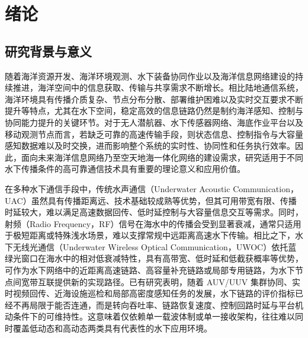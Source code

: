 \chapter{绪论}
\label{chap:intro}

\section{研究背景与意义} 
\label{sec:background}

随着海洋资源开发、海洋环境观测、水下装备协同作业以及海洋信息网络建设的持续推进，海洋空间中的信息获取、传输与共享需求不断增长。相比陆地通信系统，海洋环境具有传播介质复杂、节点分布分散、部署维护困难以及实时交互要求不断提升等特点，尤其在水下空间，稳定高效的信息链路仍然是制约海洋感知、控制与协同能力提升的关键环节。对于无人潜航器、水下传感器网络、海底作业平台以及移动观测节点而言，若缺乏可靠的高速传输手段，则状态信息、控制指令与大容量感知数据难以及时交换，进而影响整个系统的实时性、协同性和任务执行效率。因此，面向未来海洋信息网络乃至空天地海一体化网络的建设需求，研究适用于不同水下传播条件的高可靠通信技术具有重要的理论意义和应用价值\cite{zhangShuiXiaWuRenQianHangQiJiQunFaZhanXianZhuangJiGuanJianJiShuZongShu2020, hoeherUnderwaterOpticalWireless2021}。

在多种水下通信手段中，传统水声通信（Underwater Acoustic Communication，UAC）虽然具有传播距离远、技术基础较成熟等优势，但其可用带宽有限、传播时延较大，难以满足高速数据回传、低时延控制与大容量信息交互等需求\cite{liRecentProgressUnderwater2025, jungControlRealTimeMonitoring2025}。同时，射频（Radio Frequency，RF）信号在海水中的传播会受到显著衰减，通常只适用于极短距离或特殊浅水场景，难以支撑常规中远距离高速水下传输\cite{wangEvolutionShortRangeOptical2023}。相比之下，水下无线光通信（Underwater Wireless Optical Communication，UWOC）依托蓝绿光窗口在海水中的相对低衰减特性，具有高带宽、低时延和低截获概率等优势，可作为水下网络中的近距离高速链路、高容量补充链路或局部专用链路，为水下节点间宽带互联提供新的实现路径\cite{kaushalUnderwaterOpticalWireless2016a, departmentofphysicsfacultyofscienceskingabdulazizuniversityjeddah-21589kingdomofsaudiarabiaUnderwaterOpticalCommunications2021a}。已有研究表明，随着 AUV/UUV 集群协同、实时视频回传、近海设施巡检和局部高密度感知任务的发展，水下链路的评价指标已经不再局限于能否连通，而是转向吞吐率、链路恢复速度、控制回路时延与平台机动条件下的可维持性\cite{hoeherUnderwaterOpticalWireless2021, liRecentProgressUnderwater2025, jungControlRealTimeMonitoring2025}。这意味着仅依赖单一载波体制或单一接收架构，往往难以同时覆盖低动态和高动态两类具有代表性的水下应用环境。

